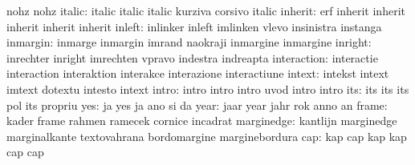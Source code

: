                            nohz                      nohz
                   italic: italic                    italic
                           italic                    kurziva
                           corsivo                   italic
                  inherit: erf                       inherit
                           inherit                   inherit
                           inherit                   inherit %
                   inleft: inlinker                  inleft
                           imlinken                  vlevo
                           insinistra                instanga
                 inmargin: inmarge                   inmargin
                           imrand                    naokraji
                           inmargine                 inmargine
                  inright: inrechter                 inright
                           imrechten                 vpravo
                           indestra                  indreapta
              interaction: interactie                interaction
                           interaktion               interakce
                           interazione               interactiune
                   intext: intekst                   intext
                           imtext                    dotextu
                           intesto                   intext
                    intro: intro                     intro
                           intro                     uvod
                           intro                     intro
                      its: its                       its
                           its                       pol
                           its                       propriu %
                      yes: ja                        yes
                           ja                        ano
                           si                        da
                     year: jaar                      year
                           jahr                      rok
                           anno                      an
                    frame: kader                     frame
                           rahmen                    ramecek
                           cornice                   incadrat
               marginedge: kantlijn                  marginedge
                           marginalkante             textovahrana
                           bordomargine              marginebordura
                      cap: kap                       cap
                           kap                       kap
                           cap                       cap
